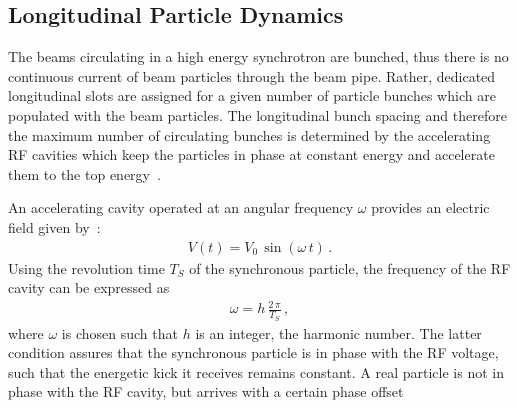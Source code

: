 \subsection{Longitudinal Particle Dynamics}



The beams circulating in a high energy synchrotron are bunched, thus there is no continuous current of beam particles through the beam pipe. Rather, dedicated longitudinal slots are assigned for a given number of particle bunches which are populated with the beam particles. The longitudinal bunch spacing and therefore the maximum number of circulating bunches is determined by the accelerating RF cavities which keep the particles in phase at constant energy and accelerate them to the top energy~\cite{wiedemann1999particle}. 

An accelerating cavity operated at an angular frequency $\omega$ provides an electric field given by~\cite{}:
\begin{align}
  V(t) = V_0 \, \sin (\omega \, t) \, .
\end{align}
Using the revolution time $T_S$ of the synchronous particle, the frequency of the RF cavity can be expressed as
\begin{align}
  \omega = h \, \frac{2 \, \pi}{T_S} \, ,
\end{align}
where $\omega$ is chosen such that $h$ is an integer, the harmonic number. The latter condition assures that the synchronous particle is in phase with the RF voltage, such that the energetic kick it receives remains constant. A real particle is not in phase with the RF cavity, but arrives with a certain phase offset
%



